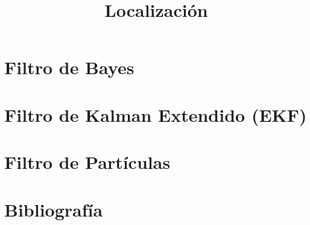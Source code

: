 \documentclass[aspectratio=169,compress]{beamer}
\title{Localización}
\author{}
\institute{Universidad Nacional de Rosario}
\date{}
\begin{document}
	
	\frame{\titlepage}
	
	\section{Filtro de Bayes}
	
	
	\section{Filtro de Kalman Extendido (EKF)}
	

   	\section{Filtro de Partículas}
    
	
	\section{Bibliografía}
	
	
	
\end{document}
